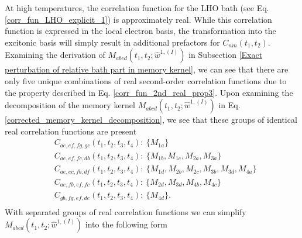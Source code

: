 At high temperatures, the correlation function for the LHO bath (see Eq. \ref{corr_fun_LHO_explicit_1}) is approximately real. While this correlation function is expressed in the local electron basis, the transformation into the excitonic basis will simply result in additional prefactors for $C_{nm}(t_1, t_2)$. Examining the derivation of $M_{abcd}(t_1, t_2; \hat{w}^{1,(I)})$ in Subsection \ref{Exact perturbation of relative bath part in memory kernel}, we can see that there are only five unique combinations of real second-order correlation functions due to the property described in Eq. \ref{corr_fun_2nd_real_prop3}. Upon examining the decomposition of the memory kernel $M_{abcd}(t_1, t_2; \hat{w}^{1,(I)})$ in Eq. \ref{corrected_memory_kernel_decomposition}, we see that these groups of identical real correlation functions are present
\begin{equation}
\label{corr_fun_2nd_real_groups}
    \begin{aligned}
        &C_{ae,ef,fg,gc}(t_1, t_2, t_3, t_4): \: \{ M_{1a} \} \\
        &C_{ae,ef,fc,db}(t_1, t_2, t_3, t_4): \: \{ M_{1b}, M_{1c}, M_{2a}, M_{3a} \} \\
        &C_{ae,ec,fb,df}(t_1, t_2, t_3, t_4): \: \{ M_{1d}, M_{2b}, M_{2c}, M_{3b}, M_{3d}, M_{4a} \} \\
        &C_{ae,fb,ef,fc}(t_1, t_2, t_3, t_4): \: \{ M_{2d}, M_{3d}, M_{4b}, M_{4c} \} \\
        &C_{gb,fg,ef,de}(t_1, t_2, t_3, t_4): \: \{ M_{4d} \}. \\
    \end{aligned}
\end{equation}
With separated groups of real correlation functions we can simplify $M_{abcd}(t_1, t_2; \hat{w}^{1,(I)})$ into the following form 

